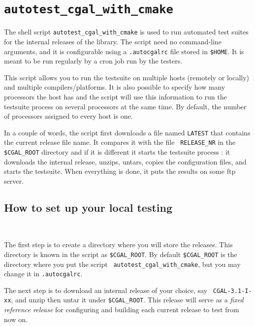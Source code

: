 
\section{{\tt autotest\_cgal\_with\_cmake}}
\label{sec:autotest_cgal_with_cmake}

The shell script {\tt autotest\_cgal\_with\_cmake} is used to run automated test suites for
the internal releases of the library. The script need no command-line
arguments, and it is configurable using a {\tt .autocgalrc} file stored
in {\tt \$HOME}.
It is meant to be run regularly by a cron job run by the testers.

This script allows you to run the testsuite on multiple hosts (remotely or
locally) and multiple compilers/platforms. It is also possible to specify how
many processors the host has and the script will use this information to run
the testsuite process on several processors at the same time. By default, the
number of processors assigned to every host is one.

In a couple of words, the script first downloads a file named {\tt LATEST}
that contains the current release file name. It compares it with the file {\tt
RELEASE\_NR} in the {\tt \$CGAL\_ROOT} directory and if it is different it
starts the testsuite process : it downloads the internal release, unzips,
untars, copies the configuration files, and starts the testsuite. When
everything is done, it puts the results on some ftp server.

\subsection{How to set up your local testing} ~

The first step is to create a directory where you will store the releases.
This directory is known in the script as {\tt \$CGAL\_ROOT}. By default
{\tt \$CGAL\_ROOT} is the directory where you put the script {\tt
autotest\_cgal\_with\_cmake}, but you may change it in {\tt .autocgalrc}.

The next step is to download an internal release of your choice, say {\tt
CGAL-3.1-I-xx}, and unzip then untar it under {\tt \$CGAL\_ROOT}.
This release will serve as a {\em fixed reference release} for configuring
and building each current release to test from now on.

